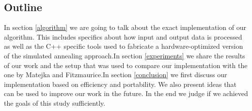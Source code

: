 \documentclass[sigconf]{acmart}
\begin{document}
\subsection{Outline}
In section \ref{algorithm} we are going to talk about the exact implementation of our algorithm. This includes specifics about how input and output data is processed as well as the C++ specific tools used to fabricate a hardware-optimized
version of the simulated annealing approach.\newline\newline In section \ref{experiments} we share the results of our work and the setup that was used to compare our implementation with the one by Matejka and Fitzmaurice.\newline\newline In section \ref{conclusion}
we first discuss our implementation based on efficiency and portability. We also present ideas that can be used to improve our work in the future. In the end we judge if we achieved the goals of this study sufficiently. 




  
  
\end{document}
